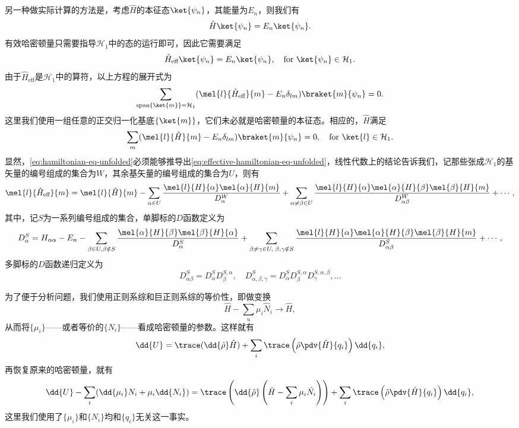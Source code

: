 另一种做实际计算的方法是，考虑$\hat{H}$的本征态$\ket{\psi_n}$，其能量为$E_n$，则我们有
\[
    \hat{H} \ket{\psi_n} = E_n \ket{\psi_n}.
\]
有效哈密顿量只需要指导$\mathcal{H}_1$中的态的运行即可，因此它需要满足
\[
    \hat{H}_\text{eff} \ket{\psi_n} = E_n \ket{\psi_n}, \quad \text{for $\ket{\psi_n} \in \mathcal{H}_1$}.
\]
由于$\hat{H}_\text{eff}$是$\mathcal{H}_1$中的算符，以上方程的展开式为
\begin{equation}
    \sum_{\text{span}\{\ket{m}\} = \mathcal{H}_1} (\mel{l}{\hat{H}_\text{eff}}{m} - E_n \delta_{lm}) \braket{m}{\psi_n} = 0.
    \label{eq:effective-hamiltonian-eq-unfolded}
\end{equation}
这里我们使用一组任意的正交归一化基底$\{\ket{m}\}$，它们未必就是哈密顿量的本征态。相应的，$\hat{H}$满足
\begin{equation}
    \sum_m (\mel{l}{\hat{H}}{m} - E_n \delta_{lm}) \braket{m}{\psi_n} = 0, \quad \text{for $\ket{l} \in \mathcal{H}_1$}.
    \label{eq:hamiltonian-eq-unfolded}
\end{equation}
显然，\eqref{eq:hamiltonian-eq-unfolded}必须能够推导出\eqref{eq:effective-hamiltonian-eq-unfolded}，线性代数上的结论告诉我们，记那些张成$\mathcal{H}_1$的基矢量的编号组成的集合为$W$，其余基矢量的编号组成的集合为$U$，则有
\[
    \mel{l}{\hat{H}_\text{eff}}{m} = \mel{l}{\hat{H}}{m} - \sum_{\alpha \in U} \frac{\mel{l}{H}{\alpha} \mel{\alpha}{H}{m}} {D_\alpha^W} + \sum_{\alpha \neq \beta \in U} \frac{\mel{l}{H}{\alpha} \mel{\alpha}{H}{\beta} \mel{\beta}{H}{m}}{D^W_{\alpha \beta}} + \cdots,
\]
其中，记$S$为一系列编号组成的集合，单脚标的$D$函数定义为
\[
    D_\alpha^S = H_{\alpha \alpha} - E_n - \sum_{\beta \in U, \beta \notin S} \frac{\mel{\alpha}{H}{\beta} \mel{\beta}{H}{\alpha}}{D_\alpha^S} + \sum_{\beta \neq \gamma \in U, \; \beta, \gamma \notin S} \frac{\mel{l}{H}{\alpha} \mel{\alpha}{H}{\beta} \mel{\beta}{H}{m}}{D_{\alpha \beta}^S} + \cdots,
\]
多脚标的$D$函数递归定义为
\[
    D_{\alpha \beta}^S = D_\alpha^S D_{\beta}^{S, \alpha}, \quad D_{\alpha, \beta, \gamma}^S = D_{\alpha}^S D_{\beta}^{S, \alpha} D_{\gamma}^{S, \alpha, \beta}, \ldots
\]

为了便于分析问题，我们使用正则系综和巨正则系综的等价性，即做变换
\[
    \hat{H} - \sum_u \mu_i \hat{N}_i \longrightarrow \hat{H},
\]
从而将$\{\mu_i\}$——或者等价的$\{N_i\}$——看成哈密顿量的参数。这样就有
\[
    \dd{U} = \trace (\dd{\hat{\rho}} \hat{H}) + \sum_i \trace \left( \hat{\rho} \pdv{\hat{H}}{q_i} \right) \dd{q_i},
\]
再恢复原来的哈密顿量，就有
\[
    \dd{U} - \sum_i (\dd{\mu_i} N_i + \mu_i \dd{N_i}) = \trace \left(\dd{\hat{\rho}} \left(\hat{H} - \sum_i \mu_i \hat{N_i} \right) \right) + \sum_i \trace \left( \hat{\rho} \pdv{\hat{H}}{q_i} \right) \dd{q_i},
\]
这里我们使用了$\{\mu_i\}$和$\{N_i\}$均和$\{q_i\}$无关这一事实。

